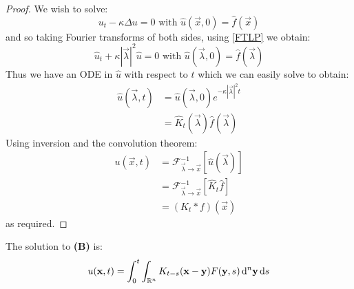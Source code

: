 \documentclass[../main.tex]{subfiles}
\begin{document}
\begin{proof}
  We wish to solve:
  \[
    u_t - \kappa \Delta u = 0 \text{ with } \hat{u}(\vec{x}, 0) = \hat{f}(\vec{x})
  \]
  and so taking Fourier transforms of both sides, using \cref{FTLP} we obtain:
  \[
    \hat{u}_t + \kappa |\vec{\lambda}|^2 \hat{u} = 0 \text{ with } \hat{u}(\vec{\lambda}, 0) = \hat{f}(\vec{\lambda})
  \]
  Thus we have an ODE in $\hat{u}$ with respect to $t$ which we can easily solve to obtain:
  \begin{align*}
    \hat{u}(\vec{\lambda}, t) &= \hat{u}(\vec{\lambda}, 0) e^{-\kappa |\vec{\lambda}|^2 t} \\
                              &= \hat{K}_t(\vec{\lambda}) \hat{f}(\vec{\lambda})
  \end{align*}
  Using inversion and the convolution theorem:
  \begin{align*}
    u(\vec{x}, t) &= \mathcal{F}^{-1}_{\vec{\lambda} \to \vec{x}}[\hat{u}(\vec{\lambda})] \\
      &= \mathcal{F}^{-1}_{\vec{\lambda} \to \vec{x}}[\hat{K}_t \hat{f}] \\
      &= (K_t \ast f)(\vec{x})
  \end{align*}
  as required.
\end{proof}
\begin{proposition}
  The solution to \textbf{(B)} is:
  \[
    u(\vec{x}, t) = \int_{0}^{t} \int_{\R^{n}} K_{t - s}(\vec{x} - \vec{y}) F(\vec{y}, s) \d^{n}{\vec{y}} \d{s}
  \]
\end{proposition}
\end{document}
